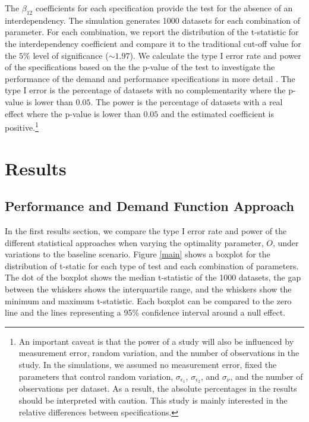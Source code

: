 \documentclass[12pt]{article}
\begin{document}
The $\beta_{12}$ coefficients for each specification provide the test for the absence of an interdependency. The simulation generates 1000 datasets for each combination of parameter. For each combination, we report the distribution of the t-statistic for the interdependency coefficient and compare it to the traditional cut-off value for the $5\%$ level of significance ($\sim 1.97$). We calculate the type I error rate and power of the specifications based on the the p-value of the test to investigate the performance of the demand and performance specifications in more detail . The type I error is the percentage of datasets with no complementarity where the p-value is lower than $0.05$. The power is the percentage of datasets with a real effect where the p-value is lower than $0.05$ and the estimated coefficient is positive.\footnote{An important caveat is that the power of a study will also be influenced by measurement error, random variation, and the number of observations in the study. In the simulations, we assumed no measurement error, fixed the parameters that control random variation, \(\sigma_{\epsilon_1}\), \(\sigma_{\epsilon_2}\), and \(\sigma_{\nu}\), and the number of observations per dataset. As a result, the absolute percentages in the results should be interpreted with caution. This study is mainly interested in the relative differences between specifications.}

\section{Results}
\subsection{Performance and Demand Function
Approach}\label{performance-and-demand-function-approach}

In the first results section, we compare the type I error rate and power of the different statistical approaches when varying the optimality parameter, $O$, under variations to the baseline scenario. Figure \ref{main} shows a boxplot for the distribution of  t-static for each type of test and each combination of parameters. The dot of the boxplot shows the median t-statistic of the 1000 datasets, the gap between the whiskers shows the interquartile range, and the whiskers show the minimum and maximum t-statistic. Each boxplot can be compared to the zero line and the lines representing a 95\% confidence interval around a null effect.
\end{document}
